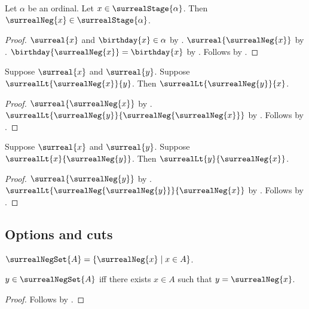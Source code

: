 \begin{proposition}\label{surreal_negation_stage}
    Let $\alpha$ be an ordinal.
    Let $x\in\surrealStage{\alpha}$.
    Then $\surrealNeg{x}\in\surrealStage{\alpha}$.
\end{proposition}
\begin{proof}
    $\surreal{x}$ and $\birthday{x}\in\alpha$
        by .
    $\surreal{\surrealNeg{x}}$
        by .
    $\birthday{\surrealNeg{x}}=\birthday{x}$
        by .
    Follows by .
\end{proof}

\begin{corollary}\label{surreal_negation_lt_left}
    Suppose $\surreal{x}$ and $\surreal{y}$.
    Suppose $\surrealLt{\surrealNeg{x}}{y}$.
    Then $\surrealLt{\surrealNeg{y}}{x}$.
\end{corollary}
\begin{proof}
    $\surreal{\surrealNeg{x}}$
        by .
    $\surrealLt{\surrealNeg{y}}{\surrealNeg{\surrealNeg{x}}}$
        by .
    Follows by .
\end{proof}

\begin{corollary}\label{surreal_negation_lt_right}
    Suppose $\surreal{x}$ and $\surreal{y}$.
    Suppose $\surrealLt{x}{\surrealNeg{y}}$.
    Then $\surrealLt{y}{\surrealNeg{x}}$.
\end{corollary}
\begin{proof}
    $\surreal{\surrealNeg{y}}$
        by .
    $\surrealLt{\surrealNeg{\surrealNeg{y}}}{\surrealNeg{x}}$
        by .
    Follows by .
\end{proof}

\subsection{Options and cuts}

\begin{definition}\label{surreal_negation_set}
    $\surrealNegSet{A}=\{\surrealNeg{x}\mid x\in A\}$.
\end{definition}

\begin{proposition}\label{surreal_negation_set_iff}
    $y\in\surrealNegSet{A}$ iff there exists $x\in A$ such that
        $y=\surrealNeg{x}$.
\end{proposition}
\begin{proof}
    Follows by .
\end{proof}

